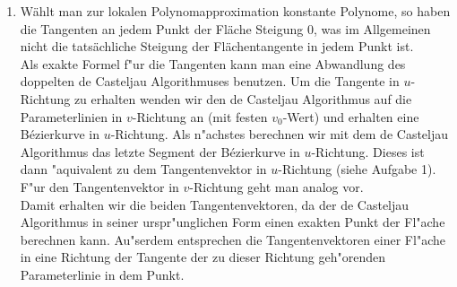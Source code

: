 \documentclass[a4paper,10pt]{scrartcl}
\begin{document}
\begin{enumerate}[1.]
\newpage
\item Wählt man zur lokalen Polynomapproximation konstante Polynome, so haben die Tangenten an jedem Punkt der Fläche Steigung $0$, was im Allgemeinen nicht die tatsächliche Steigung der Flächentangente in jedem Punkt ist.\\
Als exakte Formel f"ur die Tangenten kann man eine Abwandlung des doppelten de Casteljau Algorithmuses benutzen. Um die Tangente in $u$-Richtung zu erhalten wenden wir den de Casteljau Algorithmus auf die Parameterlinien in $v$-Richtung an (mit festen $v_0$-Wert) und erhalten eine B\'ezierkurve in $u$-Richtung. Als n"achstes berechnen wir mit dem de Casteljau Algorithmus das letzte Segment der B\'ezierkurve in $u$-Richtung. Dieses ist dann "aquivalent zu dem Tangentenvektor in $u$-Richtung (siehe Aufgabe 1). F"ur den Tangentenvektor in $v$-Richtung geht man analog vor.\\
Damit erhalten wir die beiden Tangentenvektoren, da der de Casteljau Algorithmus in seiner urspr"unglichen Form einen exakten Punkt der Fl"ache berechnen kann. Au"serdem entsprechen die Tangentenvektoren einer Fl"ache in eine Richtung der Tangente der zu dieser Richtung geh"orenden Parameterlinie in dem Punkt.

\end{enumerate}
\end{document}
